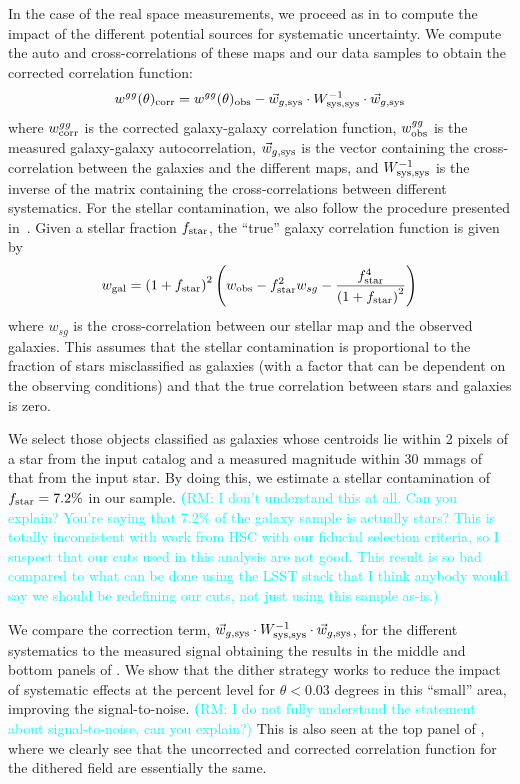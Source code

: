 \documentclass[twocolumn]{aastex62}
\newcommand{\rachel}[1]{{\textcolor{cyan}{{\textbf (RM: #1)}}}}
\begin{document}
In the case of the real space measurements, we proceed as in \citet{2016MNRAS.455.4301C} to compute the impact of the different potential sources for systematic uncertainty. We compute the auto and cross-correlations of these maps and our data samples to obtain the corrected correlation function:
\begin{equation}
w^{gg}(\theta)_{\rm corr} =w^{gg}(\theta)_{\rm obs} -  \vec{w}_{g,{\rm sys}} \cdot W_{\rm sys,sys}^{-1} \cdot \vec{w}_{g,{\rm sys}}
\end{equation}
where $w^{gg}_{\rm corr}$ is the corrected galaxy-galaxy correlation function, $w^{gg}_{\rm obs}$ is the measured galaxy-galaxy autocorrelation, $\vec{w}_{g,{\rm sys}}$ is the vector containing the cross-correlation between the galaxies and the different maps, and $W_{\rm sys,sys}^{-1}$ is the inverse of the matrix containing the cross-correlations between different systematics. For the stellar contamination, we also follow the procedure presented in~\citet{2016MNRAS.455.4301C}. Given a stellar fraction $f_{\rm star}$, the ``true'' galaxy correlation function is given by
\begin{equation}
w_{\rm gal} = \left(1+f_{\rm star}\right)^{2}\left(w_{\rm obs} - f_{\rm star}^{2}w_{sg} - \frac{f_{\rm star}^{4}}{\left(1+f_{\rm star}\right)^{2}}\right)
\end{equation}
where $w_{sg}$ is the cross-correlation between our stellar map and the observed galaxies. This assumes that the stellar contamination is proportional to the fraction of stars misclassified as galaxies (with a factor that can be dependent on the observing conditions) and that the true correlation between stars and galaxies is zero.

We select those objects classified as galaxies whose centroids lie within 2 pixels of a star from the input catalog and a measured magnitude within 30 mmags of that from the input star. By doing this, we estimate a stellar contamination of $f_{\rm star}=7.2\%$ in our sample. \rachel{I don't understand this at all.  Can you explain?  You're saying that 7.2\% of the galaxy sample is actually stars?  This is totally inconsistent with work from HSC with our fiducial selection criteria, so I suspect that our cuts used in this analysis are not good.  This result is so bad compared to what can be done using the LSST stack that I think anybody would say we should be redefining our cuts, not just using this sample as-is.}

We compare the correction term, $\vec{w}_{g,{\rm sys}} \cdot W_{\rm sys,sys}^{-1} \cdot \vec{w}_{g,{\rm sys}}$, for the different systematics to the measured signal obtaining the results in the middle and bottom panels of . We show that the dither strategy works to reduce the impact of systematic effects at the percent level for $\theta < 0.03$ degrees in this ``small'' area, improving the signal-to-noise. \rachel{I do not fully understand the statement about signal-to-noise, can you explain?} This is also seen at the top panel of , where we clearly see that the uncorrected and corrected correlation function for the dithered field are essentially the same.
\end{document}
